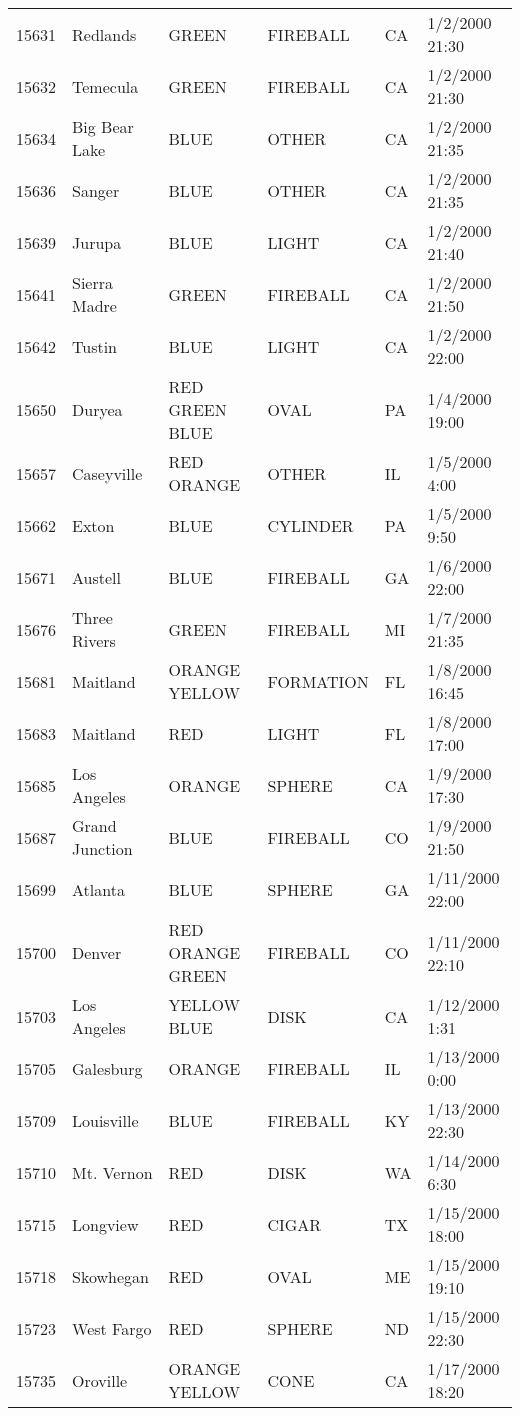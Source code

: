 \begin{tabular}{llllll}
15631 & Redlands & GREEN & FIREBALL & CA & 1/2/2000 21:30 \\
15632 & Temecula & GREEN & FIREBALL & CA & 1/2/2000 21:30 \\
15634 & Big Bear Lake & BLUE & OTHER & CA & 1/2/2000 21:35 \\
15636 & Sanger & BLUE & OTHER & CA & 1/2/2000 21:35 \\
15639 & Jurupa & BLUE & LIGHT & CA & 1/2/2000 21:40 \\
15641 & Sierra Madre & GREEN & FIREBALL & CA & 1/2/2000 21:50 \\
15642 & Tustin & BLUE & LIGHT & CA & 1/2/2000 22:00 \\
15650 & Duryea & RED GREEN BLUE & OVAL & PA & 1/4/2000 19:00 \\
15657 & Caseyville & RED ORANGE & OTHER & IL & 1/5/2000 4:00 \\
15662 & Exton & BLUE & CYLINDER & PA & 1/5/2000 9:50 \\
15671 & Austell & BLUE & FIREBALL & GA & 1/6/2000 22:00 \\
15676 & Three Rivers & GREEN & FIREBALL & MI & 1/7/2000 21:35 \\
15681 & Maitland & ORANGE YELLOW & FORMATION & FL & 1/8/2000 16:45 \\
15683 & Maitland & RED & LIGHT & FL & 1/8/2000 17:00 \\
15685 & Los Angeles & ORANGE & SPHERE & CA & 1/9/2000 17:30 \\
15687 & Grand Junction & BLUE & FIREBALL & CO & 1/9/2000 21:50 \\
15699 & Atlanta & BLUE & SPHERE & GA & 1/11/2000 22:00 \\
15700 & Denver & RED ORANGE GREEN & FIREBALL & CO & 1/11/2000 22:10 \\
15703 & Los Angeles & YELLOW BLUE & DISK & CA & 1/12/2000 1:31 \\
15705 & Galesburg & ORANGE & FIREBALL & IL & 1/13/2000 0:00 \\
15709 & Louisville & BLUE & FIREBALL & KY & 1/13/2000 22:30 \\
15710 & Mt. Vernon & RED & DISK & WA & 1/14/2000 6:30 \\
15715 & Longview & RED & CIGAR & TX & 1/15/2000 18:00 \\
15718 & Skowhegan & RED & OVAL & ME & 1/15/2000 19:10 \\
15723 & West Fargo & RED & SPHERE & ND & 1/15/2000 22:30 \\
15735 & Oroville & ORANGE YELLOW & CONE & CA & 1/17/2000 18:20 \\

\end{tabular}
